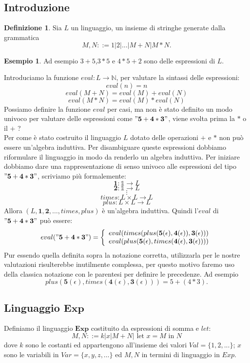 \documentclass{article}
\theoremstyle{definition}
\theoremstyle{definition}
\theoremstyle{definition}
\newtheorem{definition}[theorem]{Definizione}
\newtheorem{example}[theorem]{Esempio}
\theoremstyle{remark}
\begin{document}
    \subsection{Introduzione}
    \begin{definition}
        Sia $L$ un linguaggio, un insieme di stringhe generate dalla grammatica
        $$M,N ::= 1|2|...|M+N|M*N.$$
    \end{definition}
    \begin{example}
        Ad esempio $3+5$,$3*5$ e $4*5+2$ sono delle espressioni di $L$.
    \end{example}
    Introduciamo la funzione $eval:L\to \mathbb{N}$, per valutare la sintassi delle espressioni:
    $$eval(n) = n$$
    $$eval(M+N) = eval(M) + eval(N)$$
    $$eval(M*N) = eval(M) * eval(N)$$
    Possiamo definire la funzione $eval$ per casi, ma non è stato definito un modo univoco per
    valutare delle espressioni come $\mathbf{"5+4*3"}$, viene svolta prima la $*$ o il $+$ ?\\ Per come è stato costruito il linguaggio $L$ dotato delle operazioni $+$ e $*$ non può essere un'algebra induttiva. Per disambiguare queste espressioni dobbiamo riformulare  il linguaggio in modo da renderlo un algebra induttiva.
    Per iniziare dobbiamo dare una rappresentazione di senso univoco alle espressioni del tipo $\mathbf{"5+4*3"}$, scriviamo più formalemente:
    $$\mathbf{1}:\mathds{1}\to L$$
    $$\mathbf{2}:\mathds{1}\to L$$
    $$\vdots$$
    $$times:L\times L\to L$$
    $$plus :L\times L\to L$$
    Allora $(L,\mathbf{1},\mathbf{2},\dots,times,plus)$ è un'algebra induttiva.
    Quindi l'$eval$ di  $\mathbf{"5+4*3"}$ può essere:
    $$eval(\mathbf{"5+4*3"}) = \left\{ \begin{array}{cl}
            eval(times(plus(\mathbf{5}(\epsilon),\mathbf{4}(\epsilon)),\mathbf{3}(\epsilon))) \\
            eval(plus(\mathbf{5}(\epsilon),times(\mathbf{4}(\epsilon),\mathbf{3}(\epsilon))))
        \end{array}\right.$$
    Pur essendo quella definita sopra la notazione corretta, utilizzarla per le nostre valutazioni risulterebbe
    inutilmente complessa, per questo motivo faremo uso della classica notazione con le parentesi per definire le precedenze.
    Ad esempio $$plus(\mathbf{5}(\epsilon),times(\mathbf{4}(\epsilon),\mathbf{3}(\epsilon))) = 5+(4*3).$$
    \subsection{Linguaggio $\boldsymbol{Exp}$}
    Definiamo il linguaggio $\boldsymbol{Exp}$ costituito da espressioni di somma e $let$:
    $$ M,N ::= k|x|M+N|\text{ let $x = M$ in $N$}$$
    dove $k$ sono le costanti ed appartengono all'insieme dei valori $Val =\{1,2,...\}$; $x$ sono le variabili in $Var=\{x,y,z,\dots\}$ ed $M,N$ in termini di linguaggio in $Exp$.
\end{document}
